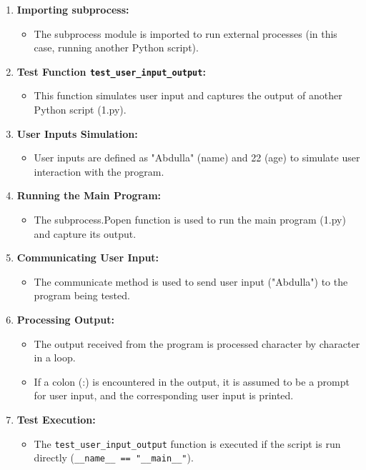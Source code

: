 \documentclass{article}
\begin{document}
\begin{enumerate}
    \item \textbf{Importing subprocess:}
    \begin{itemize}
        \item The subprocess module is imported to run external processes (in this case, running another Python script).
    \end{itemize}
    
    \item \textbf{Test Function \texttt{test\_user\_input\_output}:}
    \begin{itemize}
        \item This function simulates user input and captures the output of another Python script (1.py).
    \end{itemize}
    
    \item \textbf{User Inputs Simulation:}
    \begin{itemize}
        \item User inputs are defined as "Abdulla" (name) and 22 (age) to simulate user interaction with the program.
    \end{itemize}
    
    \item \textbf{Running the Main Program:}
    \begin{itemize}
        \item The subprocess.Popen function is used to run the main program (1.py) and capture its output.
    \end{itemize}
    
    \item \textbf{Communicating User Input:}
    \begin{itemize}
        \item The communicate method is used to send user input ("Abdulla\n") to the program being tested.
    \end{itemize}
    
    \item \textbf{Processing Output:}
    \begin{itemize}
        \item The output received from the program is processed character by character in a loop.
        \item If a colon (:) is encountered in the output, it is assumed to be a prompt for user input, and the corresponding user input is printed.
    \end{itemize}
    
    \item \textbf{Test Execution:}
    \begin{itemize}
        \item The \texttt{test\_user\_input\_output} function is executed if the script is run directly (\texttt{\_\_name\_\_ == "\_\_main\_\_"}).
    \end{itemize}
\end{enumerate}
\end{document}
